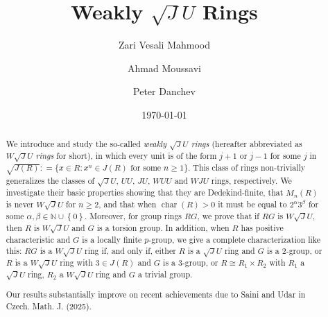 \documentclass[12pt]{amsart}
\date\today
\begin{document}
\author[Z. Vesali Mahmood]{Zari Vesali Mahmood} 
\address{Department of Mathematics, Tarbiat
Modares University, 14115-111 Tehran Jalal AleAhmad Nasr, Iran} 

\author[A. Moussavi]{Ahmad Moussavi} 
\address{Department of Mathematics, Tarbiat Modares University, 14115-111
Tehran Jalal AleAhmad Nasr, Iran} 

\author[P. Danchev]{Peter Danchev}
\address{Institute of Mathematics and Informatics, Bulgarian Academy of Sciences, 1113 Sofia, Bulgaria}

\title[weakly $\sqrt{J}U$ rings]{Weakly $\sqrt{J}U$ Rings}

\maketitle


\begin{abstract} We introduce and study the so-called {\it weakly $\sqrt{J}U$ rings} (hereafter abbreviated as {\it $W\sqrt{J}U$ rings} for short), in which every unit is of the form $j+1$ or $j-1$ for some $j$ in $\sqrt{J(R)} : = \{x \in R : x^n \in J(R) \text{ for some } n\ge 1\}$. This class of rings non-trivially generalizes the classes of $\sqrt{J}U$, $UU$, $JU$, $WUU$ and $WJU$ rings, respectively. We investigate their basic properties showing that they are Dedekind-finite, that $M_n(R)$ is never $W\sqrt{J}U$ for $n\ge 2$, and that when $\operatorname{char}(R)>0$ it must be equal to $2^\alpha 3^\beta$ for some $\alpha, \beta \in \mathbb{N}  \cup \left\{ 0 \right\}$. Moreover, for group rings $RG$, we prove that if $RG$ is $W\sqrt{J}U$, then $R$ is $W\sqrt{J}U$ and $G$ is a torsion group. In addition, when $R$ has positive characteristic and $G$ is a locally finite $p$-group, we give a complete characterization like this: $RG$ is a $W\sqrt{J}U$ ring if, and only if, either $R$ is a $\sqrt{J}U$ ring and $G$ is a $2$-group, or $R$ is a $W\sqrt{J}U$ ring with $3\in J(R)$ and $G$ is a $3$-group, or $R\cong R_1\times R_2$ with $R_1$ a $\sqrt{J}U$ ring, $R_2$ a $W\sqrt{J}U$ ring and $G$ a trivial group. 	

Our results substantially improve on recent achievements due to Saini and Udar in Czech. Math. J. (2025).
\end{abstract}
\end{document}
